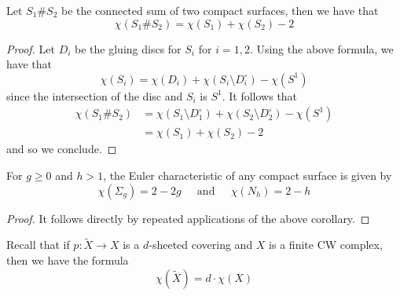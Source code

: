 \documentclass[a4paper]{article}
\begin{document}
\begin{crl}{}{} Let $S_1\# S_2$ be the connected sum of two compact surfaces, then we have that $$\chi(S_1\# S_2)=\chi(S_1)+\chi(S_2)-2$$ \tcbline
\begin{proof}
Let $D_i$ be the gluing discs for $S_i$ for $i=1,2$. Using the above formula, we have that $$\chi(S_i)=\chi(D_i)+\chi(S_i\setminus D_i^\circ)-\chi(S^1)$$ since the intersection of the disc and $S_i$ is $S^1$. It follows that 
\begin{align*}
\chi(S_1\# S_2)&=\chi(S_1\setminus D_1^\circ)+\chi(S_2\setminus D_2^\circ)-\chi(S^1)\\
&=\chi(S_1)+\chi(S_2)-2
\end{align*}
and so we conclude. 
\end{proof}
\end{crl}

\begin{crl}{}{} For $g\geq 0$ and $h>1$, the Euler characteristic of any compact surface is given by $$\chi(\Sigma_g)=2-2g\;\;\;\;\text{ and }\;\;\;\;\chi(N_h)=2-h$$ \tcbline
\begin{proof}
It follows directly by repeated applications of the above corollary. 
\end{proof}
\end{crl}

Recall that if $p:\widetilde{X}\to X$ is a $d$-sheeted covering and $X$ is a finite CW complex, then we have the formula $$\chi(\widetilde{X})=d\cdot\chi(X)$$
\end{document}

